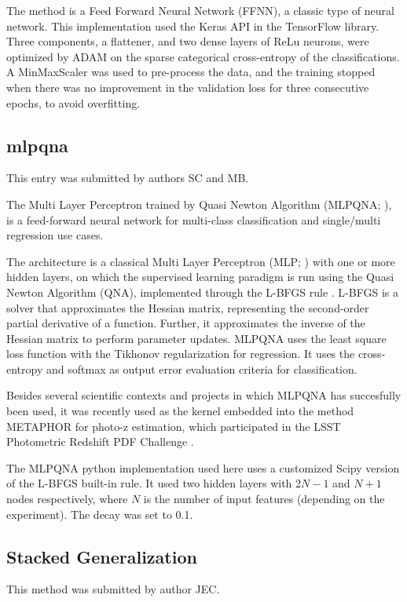 \documentclass[twocolumn,twocolappendix]{aastex63}
\begin{document}
The method is a Feed Forward Neural Network (FFNN), a classic type of neural network.
This implementation used the Keras API in the TensorFlow library. Three components, a flattener, and two 
dense layers of ReLu neurons, were optimized by ADAM on the sparse categorical cross-entropy of the classifications.
A MinMaxScaler was used to pre-process the data, and the training stopped when there was no improvement in the  
validation loss for three consecutive epochs, to avoid overfitting.


\subsection{ {\sc mlpqna} }
This entry was submitted by authors SC and MB.

The Multi Layer Perceptron trained by Quasi Newton Algorithm 
({\sc MLPQNA}; \citealp{Brescia12}), is a feed-forward neural network 
for multi-class classification and single/multi regression use cases.

The architecture is a classical Multi Layer Perceptron (MLP; \citealp{Rosenblatt1961})
with one or more hidden layers, on which the supervised learning paradigm is run
using the Quasi Newton Algorithm (QNA), implemented through the L-BFGS rule
\citep{Nocedal80}. L-BFGS is a solver that approximates the Hessian matrix,
representing the second-order partial derivative of a function. Further, it
approximates the inverse of the Hessian matrix to perform parameter updates.
MLPQNA uses the least square loss function with the Tikhonov regularization
\citep{Tikhonov77} for regression. It uses the cross-entropy \citep{deBoer05}
and softmax \citep{Sutton98} as output error evaluation criteria for
classification.

Besides several scientific contexts and projects in which MLPQNA has succesfully
been used, it was recently used as the kernel embedded into the method {\sc
METAPHOR} \citep{cavuoti20} for photo-z estimation, which participated in the
LSST Photometric Redshift PDF Challenge \citep{schmidt20}. 

The {\sc MLPQNA} python implementation used here
uses a customized Scipy version of the L-BFGS built-in rule.
It used two hidden layers with $2N-1$ and $N+1$ nodes respectively,
where $N$ is the number of input features (depending on the experiment).
The decay was set to 0.1.


\subsection{ {\sc Stacked Generalization} }
This method was submitted by author JEC.
\end{document}
